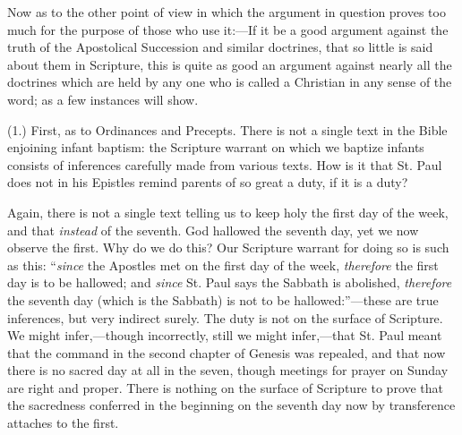 Now as to the other point of view in which the argument in question
proves too much for the purpose of those who use it:—If it be a good
argument against the truth of the Apostolical Succession and similar
doctrines, that so little is said about them in Scripture, this is
quite as good an argument against nearly all the doctrines which are
held by any one who is called a Christian in any sense of the word; as
a few instances will show.

(1.) First, as to Ordinances and Precepts. There is not a single
text in the Bible enjoining infant baptism: the Scripture warrant on
which we baptize infants consists of inferences carefully made from
various texts. How is it that St. Paul does not in his Epistles remind
parents of so great a duty, if it is a duty?

Again, there is not a single text telling us to keep holy the first
day of the week, and that \emph{instead} of the seventh. God hallowed
the seventh day, yet we now observe the first. Why do we do this? Our
Scripture warrant for doing so is such as this: ``\emph{since} the
Apostles met on the first day of the week, \emph{therefore} the first
day is to be hallowed; and \emph{since} St. Paul says the Sabbath is
abolished, \emph{therefore} the seventh day (which is the Sabbath) is
not to be hallowed:''—these are true inferences, but very
indirect surely. The duty is not on the surface of Scripture. We might
infer,—though incorrectly, still we might infer,—that St. Paul
meant that the command in the second chapter of Genesis was repealed,
and that now there is no sacred day at all in the seven, though
meetings for prayer on Sunday are right and proper. There is nothing
on the surface of Scripture to prove that the sacredness conferred in
the beginning on the seventh day now by transference attaches to the
first.

